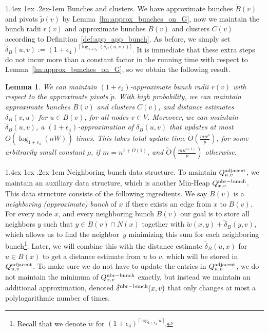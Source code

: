 \documentclass[11pt]{article}
\makeatletter
\newtheorem{lemma}[theorem]{Lemma}
\theoremstyle{definition}
\theoremstyle{remark}
\renewcommand{\paragraph}{%
  \@startsection{paragraph}{4}%
  {\z@}{1.4ex \@plus 1ex \@minus .2ex}{-1em}%
  {\normalfont\normalsize\bfseries}%
}
\makeatother
\begin{document}
\begin{titlepage}
\paragraph{Bunches and clusters.}
We have approximate bunches $\tilde B(v)$ and pivots $\tilde p(v)$ by Lemma~\ref{lm:approx_bunches_on_G}, now we maintain the bunch radii $r(v)$ and approximate bunches $B(v)$ and clusters $C(v)$ according to Definition~\ref{def:app_app_bunch}. 
As before, we simply set $\tilde \delta_B(u,v):= (1+\epsilon_4)^{\lceil\log_{1+\epsilon_4}(\delta_B(u,v))\rceil}$. It is immediate that these extra steps do not incur more than a constant factor in the running time with respect to Lemma~\ref{lm:approx_bunches_on_G}, so we obtain the following result. 

\begin{lemma}\label{lm:updatebunches}
    We can maintain $(1+\epsilon_3)$-approximate bunch radii $r(v)$ with respect to the approximate pivots $\tilde p$.
    With high probability, we can maintain approximate bunches $B(v)$ and clusters $C(v)$, and distance estimates $\delta_B(v,u)$ for $u\in B(v)$, for all nodes $v\in V$. Moreover, we can maintain $\tilde \delta_B(u,v)$, a $(1+\epsilon_4)$-approximation of $\delta_B(u,v)$ that updates at most $O(\log_{1+\epsilon_4}(nW))$ times. This takes total update time $ \tilde O (\tfrac{mn^\rho}{p}) $, for some arbitrarily small constant $\rho$, if $m=n^{1+\Omega(1)}$, and $\tilde O(\tfrac{mn^{o(1)}}{p})$ otherwise. 
\end{lemma}






\paragraph{Neighboring bunch data structure.} 
To maintain $Q^{\rm{adjacent}}_{u,v}$, we maintain an auxiliary data structure, which is another Min-Heap $Q^{\rm{nbr-bunch}}_{x,v}$. This data structure consists of the following ingredients. We say $B(v)$ is a \emph{neighboring (approximate) bunch} of $x$ if there exists an edge from $x$ to $B(v)$. For every node $ x $, and every neighboring bunch $ B (v) $ our goal is to store  all neighbors $ y $ such that $ y \in B (v) \cap N(x) $ together with $ \tilde w (x, y) + \tilde\delta_B(y, v) $, which allows us to find the neighbor~$ y $ minimizing this sum for each neighboring bunch\footnote{Recall that we denote $\tilde w$ for $(1+\epsilon_4)^{\lceil\log_{1+\epsilon_4}{w}\rceil}$.}. Later, we will combine this with the distance estimate $\tilde\delta_B(u,x)$ for $u\in B(x)$ to get a distance estimate from $u$ to $v$, which will be stored in $Q^{\rm{adjacent}}_{u,v}$. To make sure we do not have to update the entries in $Q^{\rm{adjacent}}_{u,v}$, we do not maintain the minimum of $Q^{\rm{nbr-bunch}}_{x,v}$ exactly, but instead we maintain an additional approximation, denoted $\tilde\delta^{\rm{nbr-bunch}}(x,v)$ that only changes at most a polylogarithmic number of times.


\end{titlepage}
\end{document}
